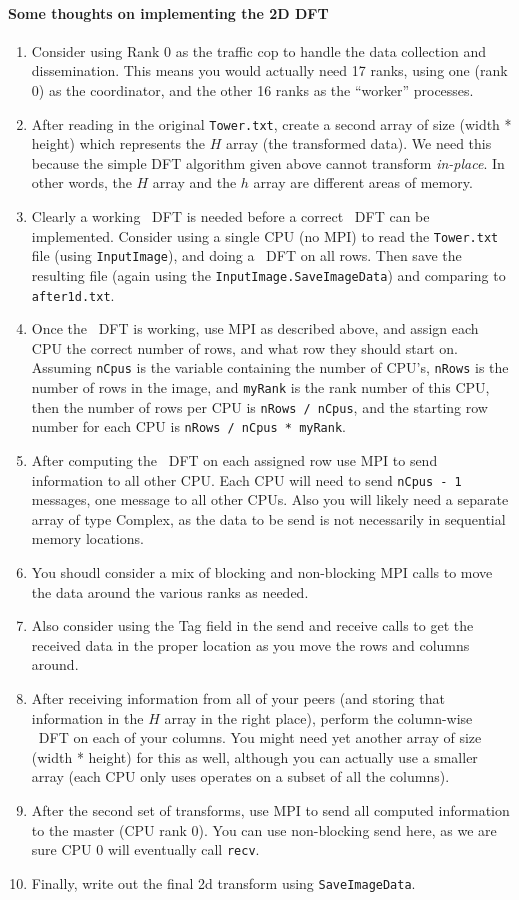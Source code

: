 \documentclass[10pt]{article}
\begin{document}
\paragraph{Some thoughts on implementing the 2D DFT}
\begin{enumerate}
\item Consider using Rank 0 as the traffic cop to handle the data
collection and dissemination.  This means you would actually need
17 ranks, using one (rank 0) as the coordinator, and the other 
16 ranks as the ``worker'' processes.
\item After reading in the original {\tt Tower.txt}, create a second
array of size (width * height) which represents the $H$ array (the
transformed data).  We need this because the simple DFT algorithm
given above cannot transform {\em in-place}. In other words, the
$H$ array and the $h$ array are different areas of memory.
\item Clearly a working \od\ DFT is needed before a correct \td\ 
DFT can be implemented.  Consider using a single CPU (no MPI) to
read the {\tt Tower.txt} file (using {\tt InputImage}), and doing
a \od\ DFT on all rows. Then save the resulting file (again
using the {\tt InputImage.SaveImageData}) and comparing to 
{\tt after1d.txt}.
\item Once the \od\ DFT is working, use MPI as described above, and
assign each CPU the correct number of rows, and what row they
should start on.  Assuming {\tt nCpus} is the variable containing the
number of CPU's, {\tt nRows} is the number of rows in the image, and
{\tt myRank} is the rank number of this CPU, then the number of rows
per CPU is {\tt nRows / nCpus}, and the starting row number for
each CPU is {\tt nRows / nCpus * myRank}.
\item After computing the \od\ DFT on each assigned row use MPI
to send information to all other CPU.  Each CPU will need to send
{\tt nCpus - 1} messages, one message to all other CPUs.  Also you will
likely need a separate array of type Complex, as the data to be send
is not necessarily in sequential memory locations.
\item You shoudl consider a mix of blocking and non-blocking MPI
calls to move the data around the various ranks as needed.
\item Also consider using the Tag field in the send and receive
calls to get the received data in the proper location as you move
the rows and columns around.
\item After receiving information from all of your peers (and storing
that information in the $H$ array in the right place), perform the
column-wise \od\ DFT on each of your columns.
You might need yet another array of size (width * height) for this
as well, although you can actually use a smaller array (each CPU only
uses operates on a subset of all the columns).
\item After the second set of transforms, use MPI to send all computed
information to the master (CPU rank 0).  You can use non-blocking
send here, as we are sure CPU 0 will eventually call {\tt recv}.
\item Finally, write out the final 2d transform using {\tt SaveImageData}.
\end{enumerate}
\end{document}
